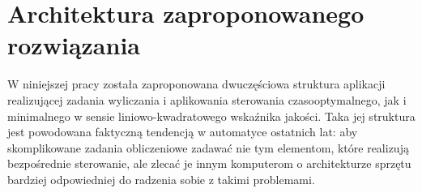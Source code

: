 \chapter{Architektura zaproponowanego rozwiązania}
\label{cha:arch}

W niniejszej pracy została zaproponowana dwuczęściowa struktura aplikacji realizującej zadania wyliczania i aplikowania sterowania czasooptymalnego, jak i minimalnego w sensie liniowo-kwadratowego wskaźnika jakości. Taka jej struktura jest powodowana faktyczną tendencją w automatyce ostatnich lat: aby skomplikowane zadania obliczeniowe zadawać nie tym elementom, które realizują bezpośrednie sterowanie, ale zlecać je innym komputerom o architekturze sprzętu bardziej odpowiedniej do radzenia sobie z takimi problemami.








